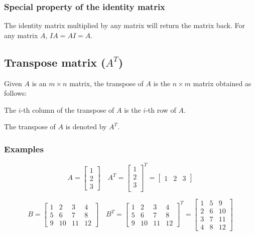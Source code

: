 \documentclass[11pt]{article}
\begin{document}
\subsubsection{Special property of the identity matrix}
\label{sec:org23fe3f6}
The identity matrix multiplied by any matrix will return the matrix back. For any matrix \(A\), \(IA = AI = A\).
\subsection{Transpose matrix (\(A^T\))}
\label{sec:orgac0c9cc}
Given \(A\) is an \(m \times n\) matrix, the transpose of \(A\) is the \(n \times m\) matrix obtained as follows:

The \(i\)-th column of the transpose of \(A\) is the \(i\)-th row of \(A\).


The transpose of \(A\) is denoted by \(A^T\).
\subsubsection{Examples}
\label{sec:orgabf1986}
\begin{displaymath}
A = \begin{bmatrix}
1 \\
2 \\
3
\end{bmatrix} \quad A^{T} = \begin{bmatrix}
1 \\
2 \\
3 \\
\end{bmatrix}^{T} = \begin{bmatrix}
1 & 2 & 3
\end{bmatrix}
\end{displaymath}

\begin{displaymath}
B = \begin{bmatrix}
1 & 2 & 3 & 4 \\
5 & 6 & 7 & 8 \\
9 & 10 & 11 & 12
\end{bmatrix} \quad B^{T} = \begin{bmatrix}
1 & 2 & 3 & 4 \\
5 & 6 & 7 & 8 \\
9 & 10 & 11 & 12
\end{bmatrix}^{T} = \begin{bmatrix}
1 & 5 & 9 \\
2 & 6 & 10 \\
3 & 7 & 11 \\
4 & 8 & 12
\end{bmatrix}
\end{displaymath}
\end{document}
